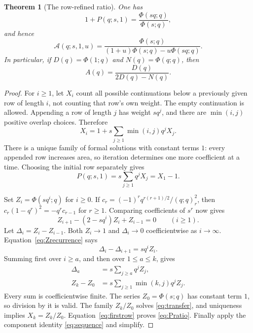 \documentclass[11pt,letterpaper]{article}
\numberwithin{equation}{section}
\newtheorem{theorem}{Theorem}[section]
\theoremstyle{definition}
\newcommand{\Aall}{\mathcal A}
\begin{document}
\begin{theorem}[The row-refined ratio]
\label{thm:qseries}
One has
\begin{equation}
 1+P(q;s,1)=\frac{\Phi(sq;q)}{\Phi(s;q)},
 \label{eq:Pratio}
\end{equation}
and hence
\begin{equation}
 \Aall(q;s,1,u)=
 \frac{\Phi(s;q)}{(1+u)\Phi(s;q)-u\Phi(sq;q)}.
 \label{eq:AratioRefined}
\end{equation}
In particular, if $D(q)=\Phi(1;q)$ and $N(q)=\Phi(q;q)$, then
\begin{equation}
 \boxed{\displaystyle A(q)=\frac{D(q)}{2D(q)-N(q)}.}
 \label{eq:Aratio}
\end{equation}
\end{theorem}
\begin{proof}
For $i\ge1$, let $X_i$ count all possible continuations below a
previously given row of length $i$, not counting that row's own weight.
The empty continuation is allowed. Appending a row of length $j$ has
weight $sq^j$, and there are $\min(i,j)$ positive overlap choices.
Therefore
\begin{equation}
 X_i=1+s\sum_{j\ge1}\min(i,j)q^jX_j.
 \label{eq:transfer}
\end{equation}
There is a unique family of formal solutions with constant terms $1$:
every appended row increases area, so iteration determines one more
coefficient at a time. Choosing the initial row separately gives
\begin{equation}
 P(q;s,1)=s\sum_{j\ge1}q^jX_j=X_1-1.
 \label{eq:firstrow}
\end{equation}

Set $Z_i=\Phi(sq^i;q)$ for $i\ge0$. If
$c_r=(-1)^rq^{r(r+1)/2}/(q;q)_r^2$, then
$c_r(1-q^r)^2=-q^rc_{r-1}$ for $r\ge1$. Comparing coefficients of $s^r$
now gives
\begin{equation}
 Z_{i+1}-(2-sq^i)Z_i+Z_{i-1}=0\qquad(i\ge1).
 \label{eq:Zrecurrence}
\end{equation}
Let $\Delta_i=Z_i-Z_{i-1}$. Both $Z_i\to1$ and $\Delta_i\to0$
coefficientwise as $i\to\infty$. Equation~\eqref{eq:Zrecurrence} says
\[
 \Delta_i-\Delta_{i+1}=sq^iZ_i.
\]
Summing first over $i\ge a$, and then over $1\le a\le k$, gives
\begin{align*}
 \Delta_a&=s\sum_{j\ge a}q^jZ_j,\\
 Z_k-Z_0&=s\sum_{j\ge1}\min(k,j)q^jZ_j.
\end{align*}
Every sum is coefficientwise finite. The series $Z_0=\Phi(s;q)$ has
constant term $1$, so division by it is valid. The family $Z_k/Z_0$ solves
\eqref{eq:transfer}, and uniqueness implies $X_k=Z_k/Z_0$.
Equation~\eqref{eq:firstrow} proves \eqref{eq:Pratio}. Finally apply the
component identity \eqref{eq:sequence} and simplify.
\end{proof}
\end{document}
